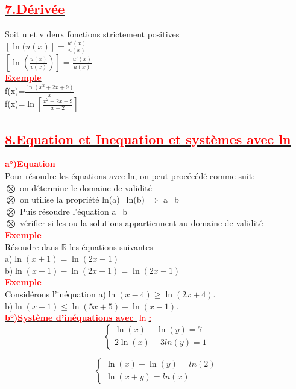 \documentclass[12pt]{article}
\begin{document}
\subsection*{\underline{\textbf{\textcolor{red}{7.Dérivée}}}}
Soit u et v deux fonctions strictement positives \\
$[\ln(u(x)]=\frac{u'(x)}{u(x)}$\\
$[\ln(\frac{u(x)}{v(x)})]=\frac{u'(x)}{u(x)}$\\
\underline{\textbf{\textcolor{red}{Exemple}}}\\
f(x)=$\frac{\ln(x^{2}+2x+9)}{x}$\\
f(x)=$\ln[\frac{x^{2}+2x+9}{x-2}]$
\subsection*{\underline{\textbf{\textcolor{red}{8.Equation et Inequation et systèmes avec ln}}}}
\underline{\textbf{\textcolor{red}{a°)Equation}}}\\
Pour résoudre les équations avec ln, on peut procécédé comme suit:\\
$\bigotimes$ on détermine le domaine de validité\\
$\bigotimes$ on utilise la propriété ln(a)=ln(b) $\Longrightarrow$ a=b \\
$\bigotimes$ Puis résoudre l'équation a=b\\
$\bigotimes$ vérifier si les ou la solutions appartiennent au domaine de validité\\
\underline{\textbf{\textcolor{red}{Exemple}}}\\
Résoudre dans $\mathbb{R}$ les équations suivantes\\
a)$\ln(x+1)=\ln(2x-1)$\\
b)$\ln(x+1)-\ln(2x+1)=\ln(2x-1)$\\
\underline{\textbf{\textcolor{red}{Exemple}}}\\
Considérons l'inéquation 
a)$\ln(x-4)\geq \ln(2x+4).$\\
b)$\ln(x-1)\leq \ln(5x+5)-\ln(x-1).$\\
\underline{\textbf{\textcolor{red}{b°)Système d'inéquations avec $\ln$:}}}\\
\[
\begin{cases}
\ln(x)+\ln(y) = 7 \\
2\ln(x)-3ln(y) = 1
\end{cases}
\]

\[
\begin{cases}
\ln(x)+\ln(y) = ln(2) \\
\ln(x+y) = ln(x)
\end{cases}
\]
\end{document}
